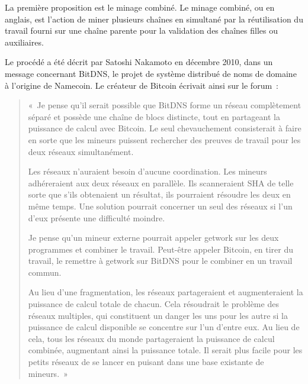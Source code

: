 
La première proposition est le minage combiné. Le minage combiné, ou  en anglais, est l'action de miner plusieurs chaînes en simultané par la réutilisation du travail fourni sur une chaîne parente pour la validation des chaînes filles ou auxiliaires.

Le procédé a été décrit par Satoshi Nakamoto en décembre 2010, dans un message concernant BitDNS, le projet de système distribué de noms de domaine à l'origine de Namecoin. Le créateur de Bitcoin écrivait ainsi sur le forum~:

\begin{quote}
«~Je pense qu'il serait possible que BitDNS forme un réseau complètement séparé et possède une chaîne de blocs distincte, tout en partageant la puissance de calcul avec Bitcoin. Le seul chevauchement consisterait à faire en sorte que les mineurs puissent rechercher des preuves de travail pour les deux réseaux simultanément.

Les réseaux n'auraient besoin d'aucune coordination. Les mineurs adhéreraient aux deux réseaux en parallèle. Ils scanneraient SHA de telle sorte que s'ils obtenaient un résultat, ils pourraient résoudre les deux en même temps. Une solution pourrait concerner un seul des réseaux si l'un d'eux présente une difficulté moindre.

Je pense qu'un mineur externe pourrait appeler getwork sur les deux programmes et combiner le travail. Peut-être appeler Bitcoin, en tirer du travail, le remettre à getwork sur BitDNS pour le combiner en un travail commun.

Au lieu d'une fragmentation, les réseaux partageraient et augmenteraient la puissance de calcul totale de chacun. Cela résoudrait le problème des réseaux multiples, qui constituent un danger les uns pour les autre si la puissance de calcul disponible se concentre sur l'un d'entre eux. Au lieu de cela, tous les réseaux du monde partageraient la puissance de calcul combinée, augmentant ainsi la puissance totale. Il serait plus facile pour les petits réseaux de se lancer en puisant dans une base existante de mineurs.~»
\end{quote}

